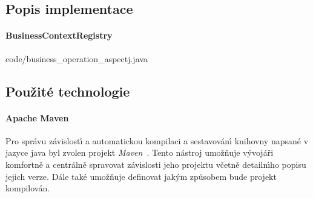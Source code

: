 
\subsection{Popis implementace}

\paragraph{BusinessContextRegistry}


{code/business_operation_aspectj.java}

\subsection{Použité technologie}

\paragraph{Apache Maven}

Pro správu závislost\'{\i} a automatickou kompilaci a sestavován\'{\i}
knihovny napsané v jazyce java byl zvolen projekt \textit{Maven}~\cite{maven}.
Tento nástroj umožňuje v\'yvojáři komfortně a centrálně
spravovat závislosti jeho projektu včetně detailn\'{\i}ho
popisu jejich verze. Dále také umožňuje definovat jak\'ym
způsobem bude projekt kompilován.

